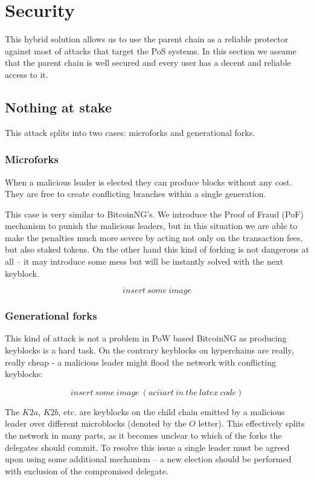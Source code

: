 \section{Security}

This hybrid solution allows us to use the parent chain as a
reliable protector against most of attacks that target the PoS systems.
\cite{pos_attacks}
In this section we assume that the parent chain is well secured and every
user has a decent and reliable access to it.

\subsection{Nothing at stake}

This attack splits into two cases: microforks and generational forks.

\subsubsection{Microforks}

When a malicious leader is elected they can produce blocks without any cost.
They are free to create conflicting branches within a single generation.

This case is very similar to BitcoinNG's. We introduce the Proof of Fraud (PoF)
mechanism to punish the malicious leaders, but in this situation we are able to
make the penalties much more severe by acting not only on the transaction fees,
but also staked tokens. On the other hand this kind of forking is
not dangerous at all – it may introduce some mess but will be instantly solved
with the next keyblock.

$$insert\ some\ image$$

\subsubsection{Generational forks}

This kind of attack is not a problem in PoW based BitcoinNG as producing
keyblocks is a hard task. On the contrary keyblocks on hyperchains are really,
really cheap - a malicious leader might flood the network with conflicting
keyblocks:

$$insert\ some\ image\ (aciiart\ in\ the\ latex\ code)$$

The $K2a$, $K2b$, etc. are keyblocks on the child chain emitted by a malicious
leader over different microblocks (denoted by the $O$ letter). This
effectively splits the network in many parts, as it becomes unclear to which of
the forks the delegates should commit. To resolve this issue a single leader
must be agreed upon using some additional mechanism – a new election
should be performed with exclusion of the compromised delegate.

